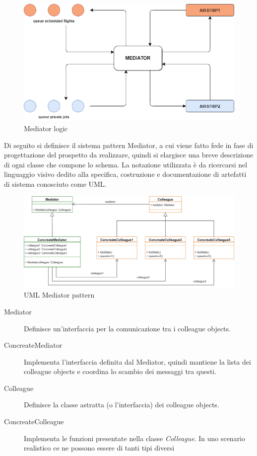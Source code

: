 \documentclass{article}
\begin{document}
\begin{sloppy}
\begin{figure}[H]
    \centering
    \includegraphics[scale=0.4]{figure4.png}
    \caption{Mediator logic}
    \label{fig:enter-label}
\end{figure}

\bigbreak
\bigbreak

Di seguito si definisce il sistema pattern Mediator, a cui viene fatto fede in fase di progettazione del prospetto da realizzare, quindi si elargisce una breve descrizione di ogni classe che compone lo schema. La notazione utilizzata è da ricercarsi nel linguaggio visivo dedito alla specifica, costruzione e documentazione di artefatti di sistema conosciuto come UML. 

\bigbreak
\bigbreak

\begin{figure}[H]
    \centering
    \includegraphics[scale=0.32]{figure5.png}
    \caption{UML Mediator pattern}
    \label{fig:enter-label}
\end{figure}

\bigbreak

\begin{description}
    \item[Mediator]Definisce un'interfaccia per la comunicazione tra i colleague objects.
    \item[ConcreateMediator]Implementa l'interfaccia definita dal Mediator, quindi mantiene la lista dei colleague objects e coordina lo scambio dei messaggi tra questi.
    \item[Colleague]Definisce la classe astratta (o l'interfaccia) dei colleague objects.
    \item[ConcreateColleague]Implementa le funzioni presentate nella classe \textit{Colleague}. In uno scenario realistico ce ne possono essere di tanti tipi diversi
\end{description}


\end{sloppy}
\end{document}
